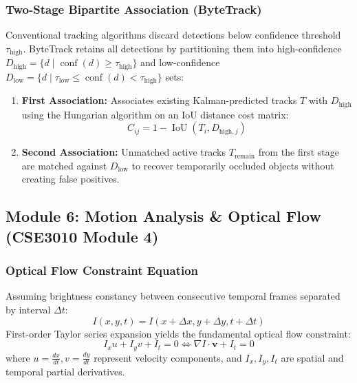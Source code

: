 \subsubsection{Two-Stage Bipartite Association (ByteTrack)}
Conventional tracking algorithms discard detections below confidence threshold $\tau_{\text{high}}$. ByteTrack retains all detections by partitioning them into high-confidence $D_{\text{high}} = \{d \mid \operatorname{conf}(d) \ge \tau_{\text{high}}\}$ and low-confidence $D_{\text{low}} = \{d \mid \tau_{\text{low}} \le \operatorname{conf}(d) < \tau_{\text{high}}\}$ sets:
\begin{enumerate}
    \item \textbf{First Association:} Associates existing Kalman-predicted tracks $T$ with $D_{\text{high}}$ using the Hungarian algorithm on an IoU distance cost matrix:
    \begin{equation}
        C_{ij} = 1 - \operatorname{IoU}(T_i, D_{\text{high}, j})
    \end{equation}
    \item \textbf{Second Association:} Unmatched active tracks $T_{\text{remain}}$ from the first stage are matched against $D_{\text{low}}$ to recover temporarily occluded objects without creating false positives.
\end{enumerate}

\subsection{Module 6: Motion Analysis \& Optical Flow (CSE3010 Module 4)}

\subsubsection{Optical Flow Constraint Equation}
Assuming brightness constancy between consecutive temporal frames separated by interval $\Delta t$:
\begin{equation}
    I(x, y, t) = I(x + \Delta x, y + \Delta y, t + \Delta t)
\end{equation}
First-order Taylor series expansion yields the fundamental optical flow constraint:
\begin{equation}
    I_x u + I_y v + I_t = 0 \iff \nabla I \cdot \mathbf{v} + I_t = 0
\end{equation}
where $u = \frac{dx}{dt}, v = \frac{dy}{dt}$ represent velocity components, and $I_x, I_y, I_t$ are spatial and temporal partial derivatives.

